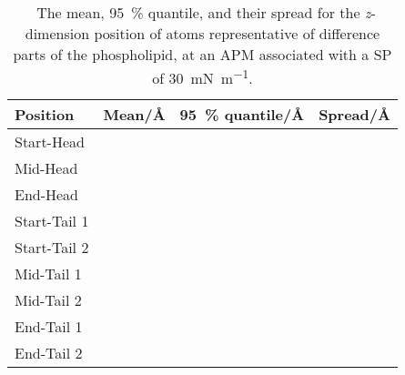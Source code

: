 \begin{table}[t]
\forcerectofloat
\centering
\small
  \caption{\ The mean, \SI{95}{\percent} quantile, and their spread for the \emph{z}-dimension position of atoms representative of difference parts of the phospholipid, at an APM associated with a SP of \SI{30}{\milli\newton\per\meter}.}
  \label{tab:spread2}
  \begin{tabular}{llll}
    \toprule
    Position & Mean/\si{\angstrom} & \SI{95}{\percent} quantile/\si{\angstrom} & Spread/\si{\angstrom} \\
    \midrule
    Start-Head &  &  &  \\
    Mid-Head &  &  &  \\
    End-Head &  &  &  \\
    \midrule
    Start-Tail 1 &  &  &  \\
    Start-Tail 2 &  &  &  \\
    Mid-Tail 1 &  &  &  \\
    Mid-Tail 2 &  &  &  \\
    End-Tail 1 &  &  &  \\
    End-Tail 2 &  &  &  \\
    \bottomrule
  \end{tabular}
\end{table}
%
